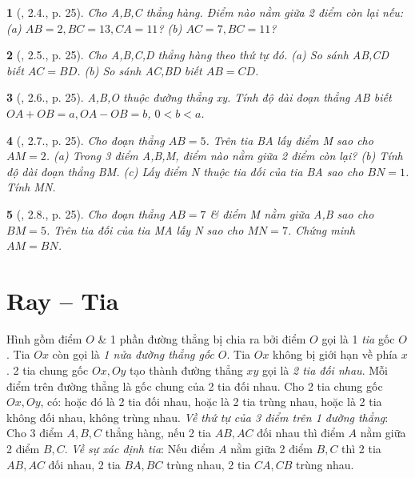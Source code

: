 \documentclass{article}
\newtheorem{baitoan}{}
\begin{document}
\begin{baitoan}[\cite{TLCT_THCS_Toan_6_hinh_hoc}, 2.4., p. 25]
	Cho A,B,C thẳng hàng. Điểm nào nằm giữa 2 điểm còn lại nếu: (a) $AB = 2,BC = 13,CA = 11$? (b) $AC = 7,BC = 11$?
\end{baitoan}

\begin{baitoan}[\cite{TLCT_THCS_Toan_6_hinh_hoc}, 2.5., p. 25]
	Cho A,B,C,D thẳng hàng theo thứ tự đó. (a) So sánh AB,CD biết $AC = BD$. (b) So sánh AC,BD biết $AB = CD$.
\end{baitoan}

\begin{baitoan}[\cite{TLCT_THCS_Toan_6_hinh_hoc}, 2.6., p. 25]
	A,B,O thuộc đường thẳng xy. Tính độ dài đoạn thẳng AB biết $OA + OB = a,OA - OB = b$, $0 < b < a$.
\end{baitoan}

\begin{baitoan}[\cite{TLCT_THCS_Toan_6_hinh_hoc}, 2.7., p. 25]
	Cho đoạn thẳng $AB = 5$. Trên tia BA lấy điểm M sao cho $AM = 2$. (a) Trong 3 điểm A,B,M, điểm nào nằm giữa 2 điểm còn lại? (b) Tính độ dài đoạn thẳng BM. (c) Lấy điểm N thuộc tia đối của tia BA sao cho $BN = 1$. Tính MN.
\end{baitoan}

\begin{baitoan}[\cite{TLCT_THCS_Toan_6_hinh_hoc}, 2.8., p. 25]
	Cho đoạn thẳng $AB = 7$ \& điểm M nằm giữa A,B sao cho $BM = 5$. Trên tia đối của tia MA lấy N sao cho $MN = 7$. Chứng minh $AM = BN$.
\end{baitoan}


\section{Ray -- Tia}
 Hình gồm điểm $O$ \& 1 phần đường thẳng bị chia ra bởi điểm $O$ gọi là 1 \textit{tia} gốc $O$. Tia $Ox$ còn gọi là \textit{1 nửa đường thẳng gốc $O$}. Tia $Ox$ không bị giới hạn về phía $x$.  2 tia chung gốc $Ox,Oy$ tạo thành đường thẳng $xy$ gọi là \textit{2 tia đối nhau}. Mỗi điểm trên đường thẳng là gốc chung của 2 tia đối nhau.  Cho 2 tia chung gốc $Ox,Oy$, có: hoặc đó là 2 tia đối nhau, hoặc là 2 tia trùng nhau, hoặc là 2 tia không đối nhau, không trùng nhau.  \textit{Về thứ tự của 3 điểm trên 1 đường thẳng}: Cho 3 điểm $A,B,C$ thẳng hàng, nếu 2 tia $AB,AC$ đối nhau thì điểm $A$ nằm giữa 2 điểm $B,C$.  \textit{Về sự xác định tia}: Nếu điểm $A$ nằm giữa 2 điểm $B,C$ thì 2 tia $AB,AC$ đối nhau, 2 tia $BA,BC$ trùng nhau, 2 tia $CA,CB$ trùng nhau.
\end{document}

